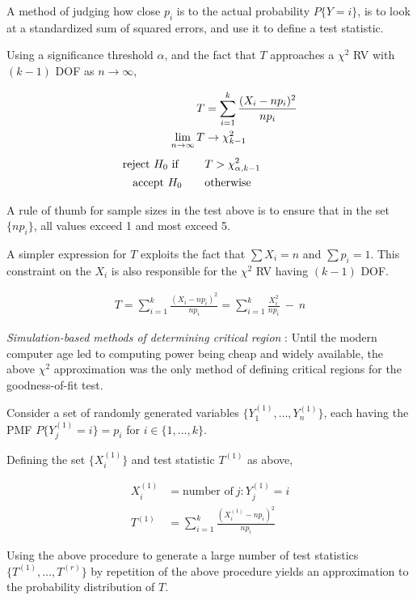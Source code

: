 A method of judging how close $ p_i $ is to the actual probability $ P\{Y = i\} $, is to look at a standardized sum of squared errors, and use it to define a test statistic.

Using a significance threshold $ \alpha $, and the fact that $ T $ approaches a $ \chi^2 $ RV with $ (k-1) $ DOF as $ n \to \infty $,


\begin{align}
	T &= \sum\limits_{i=1}^{k} \frac{(X_i - np_i)^2}{np_i}  \\
	\lim\limits_{n \to \infty} T &\to \chi^2_{k-1} \\[1ex]
	\text{reject $ H_0 $ if } \qquad & T > \chi^2_{\alpha, k-1}  \nonumber \\
	\text{accept $ H_0 $} \qquad & \text{otherwise}
\end{align}

A rule of thumb for sample sizes in the test above is to ensure that in the set $ \{np_i\} $, all values exceed 1 and most exceed 5.

A simpler expression for $ T $ exploits the fact that $ \sum X_i = n $ and $ \sum p_i = 1 $. This constraint on the $ {X_i} $ is also responsible for the $ \chi^2 $ RV having $ (k-1) $ DOF.

\begin{align}
	T = \sum\limits_{i=1}^{k} \frac{(X_i - np_i)^2}{np_i} = \sum\limits_{i=1}^{k} \frac{X_i^2}{np_i}\ -\ n
\end{align}

\textit{Simulation-based methods of determining critical region} : Until the modern computer age led to computing power being cheap and widely available, the above $ \chi^2 $ approximation was the only method of defining critical regions for the goodness-of-fit test.

Consider a set of randomly generated variables $ \{Y_1^{(1)}, \dots, Y_n^{(1)}\} $, each having the PMF $ P\{Y_j^{(1)} = i\} = p_i $ for $ i \in \{1, \dots, k\} $.

Defining the set $ \{X_i^{(1)}\} $ and test statistic $ T^{(1)} $ as above,

\begin{align}
	X_i^{(1)} &= \text{number of} \ j : Y_j^{(1)} = i \\
	T^{(1)} &= \sum\limits_{i=1}^{k} \frac{(X_i^{(1)} - np_i)^2}{np_i}
\end{align}

Using the above procedure to generate a large number of test statistics $ \{T^{(1)}, \dots, T^{(r)}\} $ by repetition of the above procedure yields an approximation to the probability distribution of $ T $.

